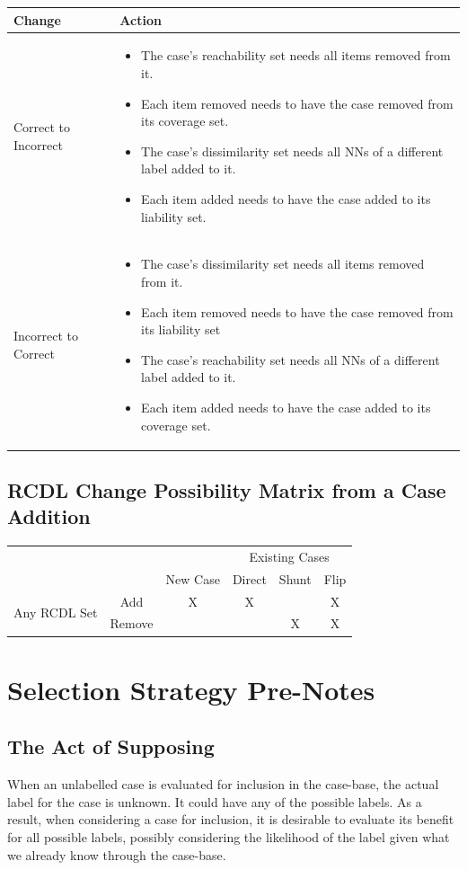 \documentclass[a4paper,11pt]{report}
\begin{document}
\begin{tabular}{|x{55pt}|x{355pt}|}
\hline 
Change & Action \tabularnewline 
\hline 
Correct to Incorrect & 
\begin{itemize}
	\item The case's reachability set needs all items removed from it.
	\item Each item removed needs to have the case removed from its coverage set.
	\item The case's dissimilarity set needs all NNs of a different label added to it.
	\item Each item added needs to have the case added to its liability set.
\end{itemize} \tabularnewline 
\hline 
Incorrect to Correct & 
\begin{itemize}
	\item The case's dissimilarity set needs all items removed from it.
	\item Each item removed needs to have the case removed from its liability set
	\item The case's reachability set needs all NNs of a different label added to it.
	\item Each item added needs to have the case added to its coverage set.
\end{itemize} \tabularnewline 
\hline 
\end{tabular}	

\subsection{RCDL Change Possibility Matrix from a Case Addition\label{sec:rcdlchangematrix}}
\begin{tabular}{|c|c|c|c|c|c|}
\cline{4-6} 
\multicolumn{1}{c}{} & \multicolumn{1}{c}{} &  & \multicolumn{3}{c|}{Existing Cases}\tabularnewline
\cline{3-6} 
\multicolumn{1}{c}{} &  & New Case & Direct & Shunt & Flip\tabularnewline
\hline
\multirow{2}{*}{Any RCDL Set} & Add & X & X &  & X\tabularnewline
\cline{2-6} 
 & Remove &  &  & X & X\tabularnewline
\hline 
\end{tabular}
	
\section{Selection Strategy Pre-Notes}
\subsection{The Act of Supposing\label{sec:actofsupposing}}
When an unlabelled case is evaluated for inclusion in the case-base, the actual label for the case is unknown. It could have any of the possible labels. As a result, when considering a case for inclusion, it is desirable to evaluate its benefit for all possible labels, possibly considering the likelihood of the label given what we already know through the case-base.
\end{document}

